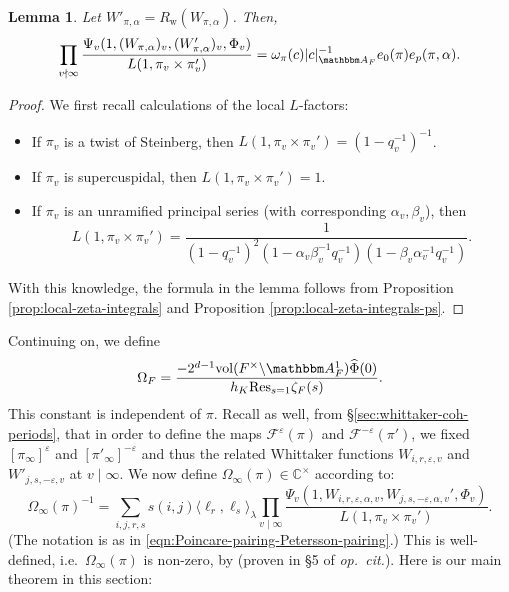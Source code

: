 \documentclass[10pt, twoside]{amsart}
\theoremstyle{plain}
\newtheorem{lemma}[theorem]{Lemma}
\theoremstyle{definition}
\theoremstyle{remark}
\numberwithin{equation}{subsection}
\def\C{\mathbb C}
\def\A{\mathbbm A}
\def\Res{\mathrm{Res}}
\def\calf{\mathcal F}
\begin{document}
\begin{lemma}\label{lemma:local-zeta-ratio}
Let $W'_{\pi,\alpha} = R_{{ \boldsymbol{\mathrm{w}}}}(W_{\pi,\alpha})$. Then,
\begin{equation*}
\prod_{v \nmid \infty} \frac{\Psi_v(1,(W_{\pi,\alpha})_v,(W_{\pi,\alpha}')_v,\Phi_v)}{L(1,\pi_v\times \pi_v')} = \omega_{\pi}(c)|c|_{\A_F}^{-1} e_0(\pi) e_p(\pi,\alpha).
\end{equation*}
\end{lemma}

\begin{proof}
We first recall calculations of the local $L$-factors:
\begin{itemize}
\item If $\pi_v$ is a twist of Steinberg, then $L(1,\pi_v\times \pi_v') = (1-q_v^{-1})^{-1}$.
\item If $\pi_v$ is supercuspidal, then $L(1,\pi_v\times \pi_v') = 1$.
\item If $\pi_v$ is an unramified principal series (with corresponding $\alpha_v,\beta_v$), then
\begin{equation*}
L(1,\pi_v\times \pi_v') = \frac{1}{(1-q_v^{-1})^2(1-\alpha_v\beta_v^{-1}q_v^{-1})(1-\beta_v\alpha_v^{-1}q_v^{-1})}.
\end{equation*}
\end{itemize}
With this knowledge, the formula in the lemma follows from Proposition \ref{prop:local-zeta-integrals} and Proposition \ref{prop:local-zeta-integrals-ps}.
\end{proof}

Continuing on, we define
\begin{equation*}
\Omega_F = \frac{-2^{d-1} \mathrm{vol}(F^\times\backslash \A_F^1)\widehat{\Phi}(0)}{h_K \Res_{s=1} \zeta_F(s)}.
\end{equation*}
This constant is independent of $\pi$. Recall as well, from \S \ref{sec:whittaker-coh-periods}, that in order to define the maps $\calf^{\varepsilon}(\pi)$ and $\calf^{-\varepsilon}(\pi')$, we fixed $[\pi_\infty]^{\varepsilon}$ and $[\pi'_\infty]^{-\varepsilon}$ and thus the related Whittaker functions $W_{i,r,\varepsilon,v}$ and $W'_{j,s,-\varepsilon,v}$ at $v \mid \infty$. We now define $\Omega_\infty(\pi) \in \C^\times$ according to:
\begin{equation*}
\Omega_\infty(\pi)^{-1} = \sum_{i,j,r,s} s(i,j)\langle \ell_r, \ell_s\rangle_\lambda \prod_{v \mid \infty} \frac{\Psi_v(1,W_{i,r,\varepsilon,\alpha,v},W_{j,s,-\varepsilon,\alpha,v}',\Phi_v)}{L(1,\pi_v\times \pi_v')}.
\end{equation*}
(The notation is as in \eqref{eqn:Poincare-pairing-Petersson-pairing}.) This is well-defined, i.e.\ $\Omega_\infty(\pi)$ is non-zero, by \cite[Proposition 3.3.8]{BaRa} (proven in \S 5 of {\em op.\ cit.}). Here is our main theorem in this section:
\end{document}
